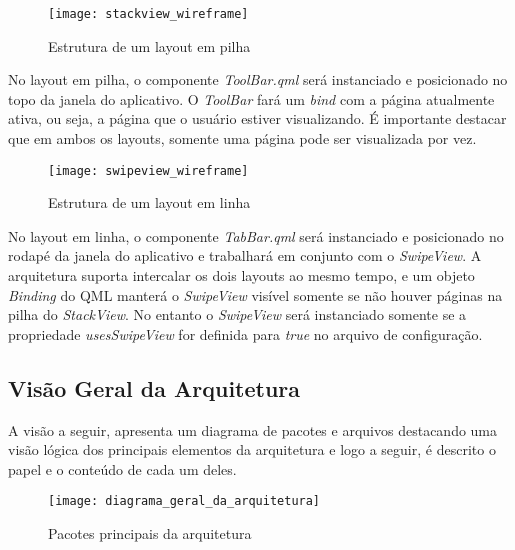 \begin{figure}[H]
	\texttt{[image: stackview\_wireframe]}
	\centering
	\caption{Estrutura de um layout em pilha}
\end{figure}

No layout em pilha, o componente \textit{ToolBar.qml} será instanciado e posicionado no topo da janela do aplicativo. O \textit{ToolBar} fará um \textit{bind} com a página atualmente ativa, ou seja, a página que o usuário estiver visualizando. É importante destacar que em ambos os layouts, somente uma página pode ser visualizada por vez.

\begin{figure}[H]
	\texttt{[image: swipeview\_wireframe]}
	\centering
	\caption{Estrutura de um layout em linha}
\end{figure}

No layout em linha, o componente \textit{TabBar.qml} será instanciado e posicionado no rodapé da janela do aplicativo e trabalhará em conjunto com o \textit{SwipeView}. A arquitetura suporta intercalar os dois layouts ao mesmo tempo, e um objeto \textit{Binding} do QML manterá o \textit{SwipeView} visível somente se não houver páginas na pilha do \textit{StackView}. No entanto o \textit{SwipeView} será instanciado somente se a propriedade \textit{usesSwipeView} for definida para \textit{true} no arquivo de configuração.\par


\subsection{Visão Geral da Arquitetura}
A visão a seguir, apresenta um diagrama de pacotes e arquivos destacando uma visão lógica dos principais elementos da arquitetura e logo a seguir, é descrito o papel e o conteúdo de cada um deles.

\begin{figure}[H]
	\texttt{[image: diagrama\_geral\_da\_arquitetura]}
	\centering
	\caption{Pacotes principais da arquitetura}
\end{figure}

